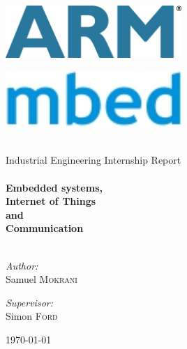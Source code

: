 
\begin{titlepage}
\begin{center}

\begin{minipage}{0.4\textwidth}
\begin{flushleft} \large
\includegraphics[width=0.5\textwidth]{./arm.jpg}
\end{flushleft}
\end{minipage}
\begin{minipage}{0.4\textwidth}
\begin{flushright}
\includegraphics[width=0.5\textwidth]{./mbed.jpg}
\end{flushright}
\end{minipage}\\[1.5cm]

\LARGE Industrial Engineering Internship Report\\[0.5cm]


\HRule \\
{ \huge \bfseries Embedded systems, \\ Internet of Things \\ and \\ Communication}\\

\HRule \\[1cm]

\begin{minipage}{0.4\textwidth}
\begin{flushleft} \large
\emph{Author:}\\
Samuel \textsc{Mokrani}
\end{flushleft}
\end{minipage}
\begin{minipage}{0.4\textwidth}
\begin{flushright} \large
\emph{Supervisor:} \\
Simon \textsc{Ford}
\end{flushright}
\end{minipage}

\vfill

{\large \today}

\end{center}

\end{titlepage}